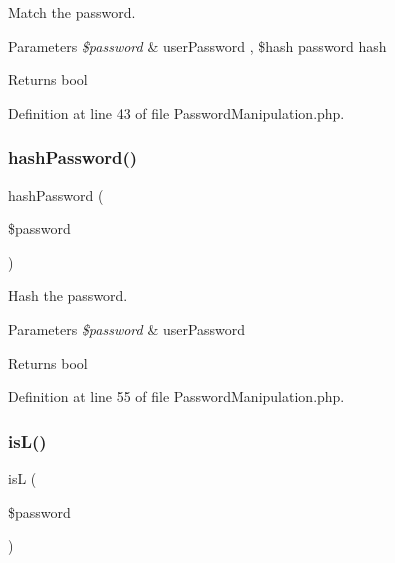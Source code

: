 Match the password.


\begin{DoxyParams}{Parameters}
{\em \$password} & user\+Password , \$hash password hash\\
\hline
\end{DoxyParams}
\begin{DoxyReturn}{Returns}
bool 
\end{DoxyReturn}


Definition at line 43 of file Password\+Manipulation.\+php.

\mbox{\label{class_zest_1_1_common_1_1_password_manipulation_a6a754638ee4a060aee99964f5a8d015d}} 
\subsubsection{\texorpdfstring{hash\+Password()}{hashPassword()}}
{\footnotesize\ttfamily hash\+Password (\begin{DoxyParamCaption}\item[{}]{\$password }\end{DoxyParamCaption})}

Hash the password.


\begin{DoxyParams}{Parameters}
{\em \$password} & user\+Password\\
\hline
\end{DoxyParams}
\begin{DoxyReturn}{Returns}
bool 
\end{DoxyReturn}


Definition at line 55 of file Password\+Manipulation.\+php.

\mbox{\label{class_zest_1_1_common_1_1_password_manipulation_af01cb5778dc27623b6edd63033139a30}} 
\subsubsection{\texorpdfstring{is\+L()}{isL()}}
{\footnotesize\ttfamily isL (\begin{DoxyParamCaption}\item[{}]{\$password }\end{DoxyParamCaption})}

